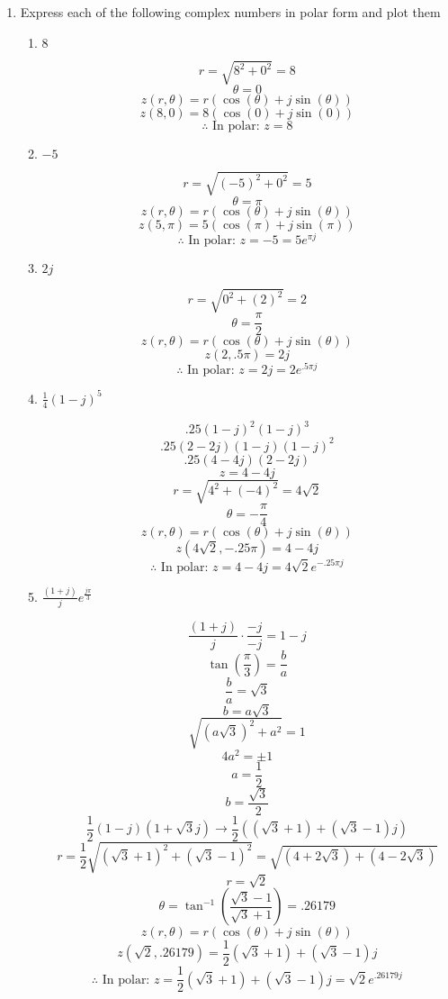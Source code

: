 \begin{enumerate}

  \item Express each of the following complex numbers in polar form and plot them

    \begin{enumerate}

      \item $8$

        $$r=\sqrt{8^2+0^2}=8$$
        $$\theta=0$$
        $$z(r,\theta)=r(\cos(\theta)+j\sin(\theta))$$
        $$z(8,0)=8(\cos(0)+j\sin(0))$$
        $$\therefore \text{ In polar: } \boxed{z=8}$$

      \item $-5$

        $$r=\sqrt{(-5)^2+0^2}=5$$
        $$\theta=\pi$$
        $$z(r,\theta)=r(\cos(\theta)+j\sin(\theta))$$
        $$z(5,\pi)=5(\cos(\pi)+j\sin(\pi))$$
        $$\therefore \text{ In polar: } \boxed{z=-5=5e^{\pi j}}$$

      \item $2j$

        $$r=\sqrt{0^2+(2)^2}=2$$
        $$\theta=\frac{\pi}{2}$$
        $$z(r,\theta)=r(\cos(\theta)+j\sin(\theta))$$
        $$z(2,.5\pi)=2j$$
        $$\therefore \text{ In polar: } \boxed{z=2j=2e^{.5\pi j}}$$

      \item $\frac{1}{4}(1-j)^5$

        $$.25(1-j)^2(1-j)^3$$
        $$.25(2-2j)(1-j)(1-j)^2$$
        $$.25(4-4j)(2-2j)$$
        $$z=4-4j$$
        $$r=\sqrt{4^2+(-4)^2}=4\sqrt{2}$$
        $$\theta=-\frac{\pi}{4}$$
        $$z(r,\theta)=r(\cos(\theta)+j\sin(\theta))$$
        $$z(4\sqrt{2},-.25\pi)=4-4j$$
        $$\therefore \text{ In polar: } \boxed{z=4-4j=4\sqrt{2}e^{-.25\pi j}}$$

      \item $\frac{(1+j)}{j}e^{\frac{j\pi}{3}}$

        $$\frac{(1+j)}{j}\cdot\frac{-j}{-j}=1-j$$
        $$\tan\left( \frac{\pi}{3} \right)=\frac{b}{a}$$
        $$\frac{b}{a}=\sqrt{3}$$
        $$b=a\sqrt{3}$$
        $$\sqrt{(a\sqrt{3})^2+a^2}=1$$
        $$4a^2=\pm1$$
        $$a=\frac{1}{2}$$
        $$b=\frac{\sqrt{3}}{2}$$
        $$\frac{1}{2}(1-j)(1+\sqrt{3}j)\to\frac{1}{2}((\sqrt{3}+1)+(\sqrt{3}-1)j)$$
        $$r=\frac{1}{2}\sqrt{(\sqrt{3}+1)^2+(\sqrt{3}-1)^2}=\sqrt{(4+2\sqrt{3})+(4-2\sqrt{3})}$$
        $$r=\sqrt{2}$$
        $$\theta=\tan^{-1}\left( \frac{\sqrt{3}-1}{\sqrt{3}+1} \right)=.26179$$
        $$z(r,\theta)=r(\cos(\theta)+j\sin(\theta))$$
        $$z(\sqrt{2},.26179)=\frac{1}{2}(\sqrt{3}+1)+(\sqrt{3}-1)j$$
        $$\therefore \text{ In polar: } \boxed{z=\frac{1}{2}(\sqrt{3}+1)+(\sqrt{3}-1)j=\sqrt{2}e^{.26179j}}$$


\end{enumerate}
\end{enumerate}
